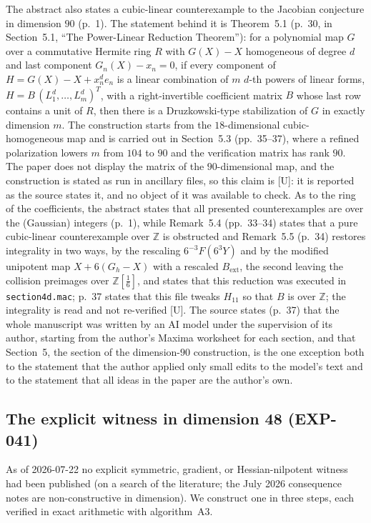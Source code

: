 \documentclass[11pt]{article}
\theoremstyle{remark}
\begin{document}
The abstract also states a cubic-linear counterexample to the Jacobian conjecture in dimension $90$ (p.~1). The statement behind it is Theorem~5.1 (p.~30, in Section~5.1, ``The Power-Linear Reduction Theorem''): for a polynomial map $G$ over a commutative Hermite ring $R$ with $G(X)-X$ homogeneous of degree $d$ and last component $G_n(X)-x_n=0$, if every component of $H=G(X)-X+x_n^d e_n$ is a linear combination of $m$ $d$-th powers of linear forms, $H=B\,(L_1^d,\dots,L_m^d)^T$, with a right-invertible coefficient matrix $B$ whose last row contains a unit of $R$, then there is a Druzkowski-type stabilization of $G$ in exactly dimension $m$. The construction starts from the $18$-dimensional cubic-homogeneous map and is carried out in Section~5.3 (pp.~35--37), where a refined polarization lowers $m$ from $104$ to $90$ and the verification matrix has rank $90$. The paper does not display the matrix of the $90$-dimensional map, and the construction is stated as run in ancillary files, so this claim is [U]: it is reported as the source states it, and no object of it was available to check. As to the ring of the coefficients, the abstract states that all presented counterexamples are over the (Gaussian) integers (p.~1), while Remark~5.4 (pp.~33--34) states that a pure cubic-linear counterexample over $\mathbb Z$ is obstructed and Remark~5.5 (p.~34) restores integrality in two ways, by the rescaling $6^{-3}F(6^3Y)$ and by the modified unipotent map $X+6(G_h-X)$ with a rescaled $B_{\mathrm{ext}}$, the second leaving the collision preimages over $\mathbb Z[\tfrac16]$, and states that this reduction was executed in \texttt{section4d.mac}; p.~37 states that this file tweaks $H_{11}$ so that $B$ is over $\mathbb Z$; the integrality is read and not re-verified [U]. The source states (p.~37) that the whole manuscript was written by an AI model under the supervision of its author, starting from the author's Maxima worksheet for each section, and that Section~5, the section of the dimension-$90$ construction, is the one exception both to the statement that the author applied only small edits to the model's text and to the statement that all ideas in the paper are the author's own. %

\subsection{The explicit witness in dimension 48 (EXP-041)}\label{sec:fortyeight}

As of 2026-07-22 no explicit symmetric, gradient, or Hessian-nilpotent witness had been published (on a search of the literature; the July 2026 consequence notes are non-constructive in dimension). We construct one in three steps, each verified in exact arithmetic with algorithm~A3.
\end{document}
